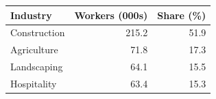 
\begin{tabular}{lrr}
\toprule
Industry & Workers (000s) & Share (\%)\\
\midrule
Construction & 215.2 & 51.9\\
Agriculture & 71.8 & 17.3\\
Landscaping & 64.1 & 15.5\\
Hospitality & 63.4 & 15.3\\
\bottomrule
\end{tabular}
